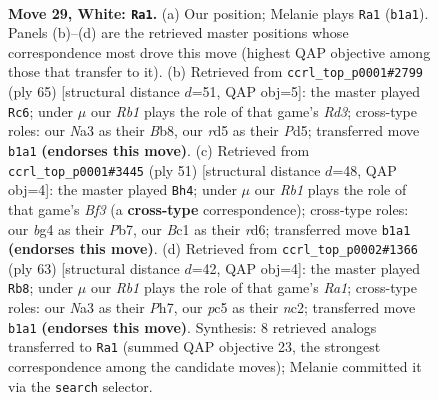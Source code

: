 \documentclass[11pt]{article}
\begin{document}
\clearpage

\begin{figure}[p]\centering
\begin{subfigure}{0.46\textwidth}\centering
\resizebox{\linewidth}{!}{%
\newchessgame
\chessboard[
  setfen={1r6/pp4k1/6pp/2pr4/4pPbP/N3P3/PP3K2/1RB5 w - - 2 29},
  showmover=false,
  pgfstyle=straightmove, color=movearrow, markmove={b1-a1}
]}
\caption{}
\end{subfigure}\hfill
\begin{subfigure}{0.46\textwidth}\centering
\resizebox{\linewidth}{!}{%
\newchessgame
\chessboard[
  setfen={1bk5/5p1p/3rp3/3p1pPP/P4P2/2P1BK2/8/2R5 b - - 2 33},
  showmover=false,
  pgfstyle=straightmove, color=movearrow, markmove={d6-c6}
]}
\caption{}
\end{subfigure}
\\[4pt]
\begin{subfigure}{0.46\textwidth}\centering
\resizebox{\linewidth}{!}{%
\newchessgame
\chessboard[
  setfen={6k1/pp5p/3R1bp1/2r1p3/4p1P1/4P2P/PP2KP1B/8 b - - 0 26},
  showmover=false,
  pgfstyle=straightmove, color=movearrow, markmove={f6-h4}
]}
\caption{}
\end{subfigure}\hfill
\begin{subfigure}{0.46\textwidth}\centering
\resizebox{\linewidth}{!}{%
\newchessgame
\chessboard[
  setfen={r3bk2/4p2p/5pp1/2R5/p4P1P/P1P5/2N2KP1/8 b - - 1 32},
  showmover=false,
  pgfstyle=straightmove, color=movearrow, markmove={a8-b8}
]}
\caption{}
\end{subfigure}
\caption{\textbf{Move 29, White: \texttt{Ra1}.} (a) Our position; Melanie plays \texttt{Ra1} (\texttt{b1a1}). Panels (b)--(d) are the retrieved master positions whose correspondence most drove this move (highest QAP objective among those that transfer to it). (b) Retrieved from \texttt{ccrl\_top\_p0001\#2799} (ply 65) [structural distance $d$=51, QAP obj=5]: the master played \texttt{Rc6}; under $\mu$ our \emph{Rb1} plays the role of that game's \emph{Rd3}; cross-type roles: our \emph{N}a3 as their \emph{B}b8, our \emph{r}d5 as their \emph{P}d5; transferred move \texttt{b1a1} \textbf{(endorses this move)}. (c) Retrieved from \texttt{ccrl\_top\_p0001\#3445} (ply 51) [structural distance $d$=48, QAP obj=4]: the master played \texttt{Bh4}; under $\mu$ our \emph{Rb1} plays the role of that game's \emph{Bf3} (a \textbf{cross-type} correspondence); cross-type roles: our \emph{b}g4 as their \emph{P}b7, our \emph{B}c1 as their \emph{r}d6; transferred move \texttt{b1a1} \textbf{(endorses this move)}. (d) Retrieved from \texttt{ccrl\_top\_p0002\#1366} (ply 63) [structural distance $d$=42, QAP obj=4]: the master played \texttt{Rb8}; under $\mu$ our \emph{Rb1} plays the role of that game's \emph{Ra1}; cross-type roles: our \emph{N}a3 as their \emph{P}h7, our \emph{p}c5 as their \emph{n}c2; transferred move \texttt{b1a1} \textbf{(endorses this move)}. Synthesis: 8 retrieved analogs transferred to \texttt{Ra1} (summed QAP objective 23, the strongest correspondence among the candidate moves); Melanie committed it via the \texttt{search} selector.}
\label{fig:thought-m56}
\end{figure}
\end{document}
